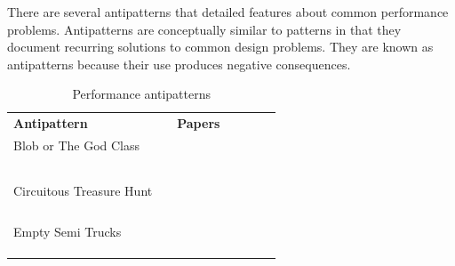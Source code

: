 \documentclass[espaco=umemeio,chapter=TITLE,twoside,openright]{abnt}
\begin{document}
There are several antipatterns that detailed features about  common performance problems. Antipatterns are conceptually similar to patterns in that they document recurring solutions to common design problems. They are known as
antipatterns because their use produces negative consequences.

\begin{table}[!h]
\centering
\caption{Performance antipatterns}
\label{antipatterns}
\begin{tabular}{|l|l|l|llll}
\cline{1-3}
\multicolumn{2}{|l|}{\cellcolor[HTML]{C0C0C0}\textbf{Antipattern}}     & \cellcolor[HTML]{C0C0C0}\textbf{Papers}                                                                        &  &  &  &  \\ \cline{1-3}
Blob or The God Class                   &                              & \begin{minipage}{0.3\textwidth} \cite{Wert2014} \\ \cite{Smith2000} \\ \cite{Trubiani2011} \\\cite{Vetoio2011} \\ \cite{Cortellessa2007} \\\cite{Smith2003} \end{minipage} &  &  &  &  \\ \cline{1-1} \cline{3-3}
Circuitous Treasure Hunt                &                              & \begin{minipage}{0.4\textwidth} \cite{Wert2014} \\ \cite{Trubiani2011}  \\ \cite{Vetoio2011} \\ \cite{Smith2003} \\ \cite{Smith2002} \end{minipage}                        &  &  &  &  \\ \cline{1-1} \cline{3-3}
Empty Semi Trucks                       &                              & \begin{minipage}{0.3\textwidth} \cite{Wert2014} \\\cite{Trubiani2011} \\ \cite{Arcelli2012} \\ \cite{Vetoio2011}                                       \end{minipage} &  &  &  &  \\ \cline{1-1} \cline{3-3}

\end{tabular}
\end{table}
\end{document}
